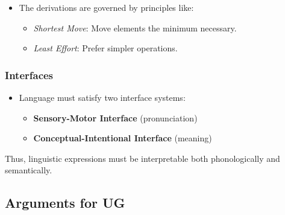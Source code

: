 \documentclass[12pt]{article}
\newcommand{\tightlist}{\itemsep 0pt\parskip 0pt\parsep 0pt}
\begin{document}
\begin{itemize}
\tightlist
\item
  The derivations are governed by principles like:

  \begin{itemize}
  \tightlist
  \item
    \emph{Shortest Move}: Move elements the minimum necessary.
  \item
    \emph{Least Effort}: Prefer simpler operations.
  \end{itemize}
\end{itemize}

\hypertarget{interfaces}{%
\subsubsection{Interfaces}\label{interfaces}}

\begin{itemize}
\tightlist
\item
  Language must satisfy two interface systems:

  \begin{itemize}
  \tightlist
  \item
    \textbf{Sensory-Motor Interface} (pronunciation)
  \item
    \textbf{Conceptual-Intentional Interface} (meaning)
  \end{itemize}
\end{itemize}

Thus, linguistic expressions must be interpretable both phonologically
and semantically.

\hypertarget{arguments-for-ug}{%
\subsection{Arguments for UG}\label{arguments-for-ug}}
\end{document}
